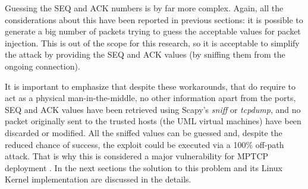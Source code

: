Guessing the SEQ and ACK numbers is by far more complex. Again, all the considerations about this have been reported in previous sections: it is possible to generate a big number of packets trying to guess the acceptable values for packet injection. This is out of the scope for this research, so it is acceptable to simplify the attack by providing the SEQ and ACK values (by sniffing them from the ongoing connection).

It is important to emphasize that despite these workarounds, that do require to act as a physical man-in-the-middle, no other information apart from the ports, SEQ and ACK values have been retrieved using Scapy's \textit{sniff} or \textit{tcpdump}, and no packet originally sent to the trusted hosts (the UML virtual machines) have been discarded or modified. All the sniffed values can be guessed and, despite the reduced chance of success, the exploit could be executed via a 100\% off-path attack. That is why this is considered a major vulnerability for MPTCP deployment \cite{rfc7430}. In the next sections the solution to this problem and its Linux Kernel implementation are discussed in the details.
